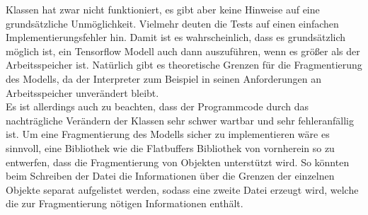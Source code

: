 Klassen hat zwar nicht funktioniert, es gibt aber keine Hinweise auf eine grundsätzliche Unmöglichkeit. Vielmehr deuten die Tests auf einen einfachen Implementierungsfehler hin. Damit ist es wahrscheinlich, dass es grundsätzlich möglich ist, ein Tensorflow Modell auch dann auszuführen, wenn es größer als der Arbeitsspeicher ist. Natürlich gibt es theoretische Grenzen für die Fragmentierung des Modells, da der Interpreter zum Beispiel in seinen Anforderungen an Arbeitsspeicher unverändert bleibt.\\ Es ist allerdings auch zu beachten, dass der Programmcode durch das nachträgliche Verändern der Klassen sehr schwer wartbar und sehr fehleranfällig ist. Um eine Fragmentierung des Modells sicher zu implementieren wäre es sinnvoll, eine Bibliothek wie die Flatbuffers Bibliothek von vornherein so zu entwerfen, dass die Fragmentierung von Objekten unterstützt wird. So könnten beim Schreiben der Datei die Informationen über die Grenzen der einzelnen Objekte separat aufgelistet werden, sodass eine zweite Datei erzeugt wird, welche die zur Fragmentierung nötigen Informationen enthält.

